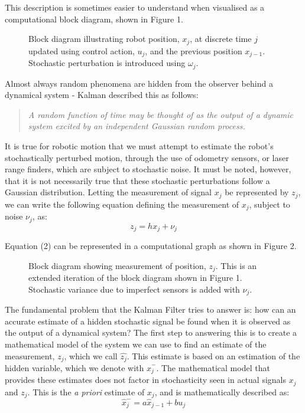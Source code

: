\documentclass[a4paper]{article}
\begin{document}
This description is sometimes easier to understand when visualised as a computational block diagram, shown in Figure 1.
\begin{figure}[h]
\centering

\caption{Block diagram illustrating robot position, $x_j$, at discrete time $j$ updated using control action, $u_j$, and the previous position $x_{j-1}$. Stochastic perturbation is introduced using $\omega_j$.}
\end{figure}

Almost always random phenomena are hidden from the observer behind a dynamical system - Kalman described this as follows:
\begin{quotation}
\noindent\textit{A random function of time may be thought of as the output of a dynamic system excited by an independent Gaussian random process.} \cite{Kalman:1960}
\end{quotation}

It is true for robotic motion that we must attempt to estimate the robot's stochastically perturbed motion, through the use of odometry sensors, or laser range finders, which are subject to stochastic noise. It must be noted, however, that it is not necessarily true that these stochastic perturbations follow a Gaussian distribution. Letting the measurement of signal $x_j$ be represented by $z_j$, we can write the following equation defining the measurement of $x_j$, subject to noise $\nu_j$, as:
\begin{equation}
z_j = h x_j + \nu_j
\end{equation} 

Equation (2) can be represented in a computational graph as shown in Figure 2.

\newpage

\begin{figure}[h]
\centering

\caption{Block diagram showing measurement of position, $z_j$. This is an extended iteration of the block diagram shown in Figure 1. Stochastic variance due to imperfect sensors is added with $\nu_j$.}
\end{figure}

The fundamental problem that the Kalman Filter tries to answer is: how can an accurate estimate of a hidden stochastic signal be found when it is observed as the output of a dynamical system? The first step to answering this is to create a mathematical model of the system we can use to find an estimate of the measurement, $z_j$, which we call $\hat{z_j}$. This estimate is based on an estimation of the hidden variable, which we denote with $\hat{x}^-_j$. The mathematical model that provides these estimates does not factor in stochasticity seen in actual signals $x_j$ and $z_j$. This is the \textit{a priori} estimate of $x_j$, and is mathematically described as:
\begin{equation}
\hat{x}^-_j = a \hat{x}_{j-1} + b u_j
\end{equation}
\end{document}
